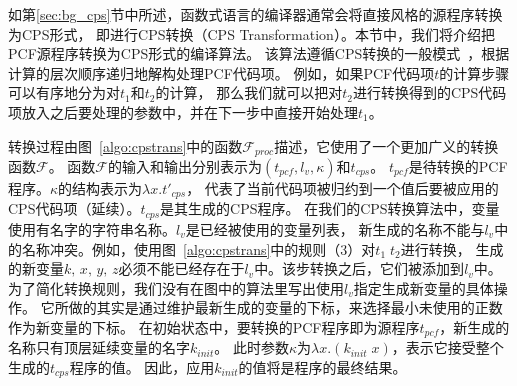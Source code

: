 如第\ref{sec:bg_cps}节中所述，函数式语言的编译器通常会将直接风格的源程序转换为CPS形式，
即进行CPS转换（CPS Transformation）。本节中，我们将介绍把PCF源程序转换为CPS形式的编译算法。
该算法遵循CPS转换的一般模式~\cite{plotkin1975call,danvy2007one}，根据计算的层次顺序递归地解构处理PCF代码项。
例如，如果PCF代码项$t$的计算步骤可以有序地分为对$t_1$和$t_2$的计算，
那么我们就可以把对$t_2$进行转换得到的CPS代码项放入之后要处理的参数中，并在下一步中直接开始处理$t_1$。 

转换过程由图~\ref{algo:cpstrans}中的函数$\mathcal{F}_{proc}$描述，它使用了一个更加广义的转换函数$\mathcal{F}$。
函数$\mathcal{F}$的输入和输出分别表示为$(t_{pcf}, l_v, \kappa)$和$t_{cps}$。
$t_{pcf}$是待转换的PCF程序。$\kappa$的结构表示为$\lambda x. t'_{cps}$，
代表了当前代码项被归约到一个值后要被应用的CPS代码项（延续）。$t_{cps}$是其生成的CPS程序。
在我们的CPS转换算法中，变量使用有名字的字符串名称。$l_v$是已经被使用的变量列表，
新生成的名称不能与$l_v$中的名称冲突。例如，使用图~\ref{algo:cpstrans}中的规则（3）对$t_1\; t_2$进行转换，
生成的新变量$k,\, x,\, y,\, z$必须不能已经存在于$l_v$中。该步转换之后，它们被添加到$l_v$中。
为了简化转换规则，我们没有在图中的算法里写出使用$l_v$指定生成新变量的具体操作。
它所做的其实是通过维护最新生成的变量的下标，来选择最小未使用的正数作为新变量的下标。
在初始状态中，要转换的PCF程序即为源程序$t_{pcf}$，新生成的名称只有顶层延续变量的名字$k_{init}$。
此时参数$\kappa$为$\lambda x. (k_{init}\; x)$，表示它接受整个生成的$t_{cps}$程序的值。
因此，应用$k_{init}$的值将是程序的最终结果。

